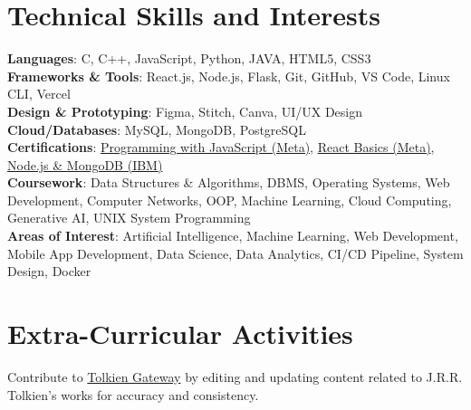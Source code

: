 \documentclass[a4paper,10pt]{article}
\begin{document}
\section{Technical Skills and Interests}
 \begin{itemize}[leftmargin=0.05in, label={}, itemsep=0mm, topsep=0mm, parsep=0mm]
    \small{\item{
     \textbf{Languages}{: C, C++, JavaScript, Python, JAVA, HTML5, CSS3} \\
     \textbf{Frameworks \& Tools}{: React.js, Node.js, Flask, Git, GitHub, VS Code, Linux CLI, Vercel} \\
     \textbf{Design \& Prototyping}{: Figma, Stitch, Canva, UI/UX Design} \\
     \textbf{Cloud/Databases}{: MySQL, MongoDB, PostgreSQL} \\
     \textbf{Certifications}{: \href{https://www.coursera.org/account/accomplishments/verify/JFC9SCH27JDX}{Programming with JavaScript (Meta)}, \href{https://coursera.org/share/167e8f527bb5c0f0370a9c0a6611eb36}{React Basics (Meta)}, \href{https://coursera.org/share/c28f6bd6d924693667883b3babda25c6}{Node.js \& MongoDB (IBM)}} \\
     \textbf{Coursework}{: Data Structures \& Algorithms, DBMS, Operating Systems, Web Development, Computer Networks, OOP, Machine Learning, Cloud Computing, Generative AI, UNIX System Programming} \\
     \textbf{Areas of Interest}{: Artificial Intelligence, Machine Learning, Web Development, Mobile App Development, Data Science, Data Analytics, CI/CD Pipeline, System Design, Docker} \\
    }}
 \end{itemize}
\vspace{-3mm}

\section{Extra-Curricular Activities}
\begin{itemize}[leftmargin=2.2ex, labelsep=1mm, itemsep=0mm, topsep=0.2mm, parsep=0mm]
  \small{\item {Contribute to \href{https://tolkiengateway.net/wiki/Main_Page}{Tolkien Gateway} by editing and updating content related to J.R.R. Tolkien's works for accuracy and consistency.}}
\end{itemize}
\vspace{-3mm}
\end{document}
